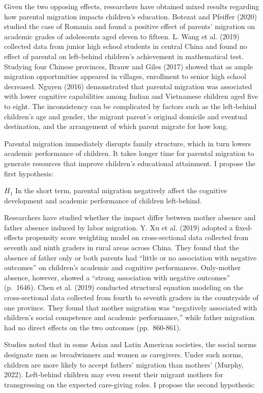 \documentclass[
  man,floatsintext]{apa7}
\begin{document}
Given the two opposing effects, researchers have obtained mixed results regarding how parental migration impacts children's education. Botezat and Pfeiffer (2020) studied the case of Romania and found a positive effect of parents' migration on academic grades of adolescents aged eleven to fifteen. L. Wang et al. (2019) collected data from junior high school students in central China and found no effect of parental on left-behind children's achievement in mathematical test. Studying four Chinese provinces, Brauw and Giles (2017) showed that as ample migration opportunities appeared in villages, enrollment to senior high school decreased. Nguyen (2016) demonstrated that parental migration was associated with lower cognitive capabilities among Indian and Vietnamese children aged five to eight. The inconsistency can be complicated by factors such as the left-behind children's age and gender, the migrant parent's original domicile and eventual destination, and the arrangement of which parent migrate for how long.

Parental migration immediately disrupts family structure, which in turn lowers academic performance of children. It takes longer time for parental migration to generate resources that improve children's educational attainment. I propose the first hypothesis:

\(H_1\) In the short term, parental migration negatively affect the cognitive development and academic performance of children left-behind.

Researchers have studied whether the impact differ between mother absence and father absence induced by labor migration. Y. Xu et al. (2019) adopted a fixed-effects propensity score weighting model on cross-sectional data collected from seventh and ninth graders in rural areas across China. They found that the absence of father only or both parents had ``little or no association with negative outcomes'' on children's academic and cognitive performances. Only-mother absence, however, showed a ``strong association with negative outcomes'' (p.~1646). Chen et al. (2019) conducted structural equation modeling on the cross-sectional data collected from fourth to seventh graders in the countryside of one province. They found that mother migration was ``negatively associated with children's social competence and academic performance,'' while father migration had no direct effects on the two outcomes (pp.~860-861).

Studies noted that in some Asian and Latin American societies, the social norms designate men as breadwinners and women as caregivers. Under such norms, children are more likely to accept fathers' migration than mothers' (Murphy, 2022). Left-behind children may even resent their migrant mothers for transgressing on the expected care-giving roles. I propose the second hypothesis:
\end{document}
